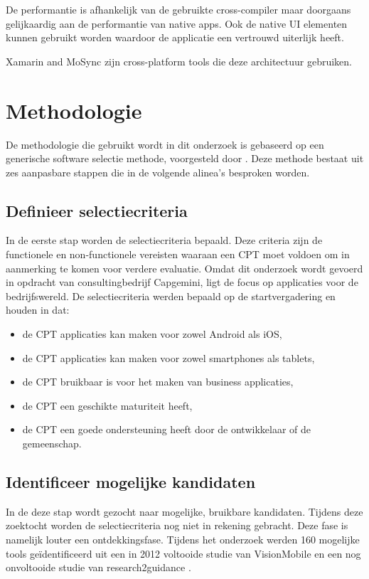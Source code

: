 \documentclass[a4paper]{IEEEconf}
\begin{document}
De performantie is afhankelijk van de gebruikte cross-compiler maar doorgaans gelijkaardig aan de performantie van native apps. Ook de native UI elementen kunnen gebruikt worden waardoor de applicatie een vertrouwd uiterlijk heeft.

Xamarin and MoSync zijn cross-platform tools die deze architectuur gebruiken.

\section{Methodologie}

De methodologie die gebruikt wordt in dit onderzoek is gebaseerd op een generische software selectie methode, voorgesteld door \citet{Jadhav:2011}. Deze methode bestaat uit zes aanpasbare stappen die in de volgende alinea's besproken worden.

\subsection{Definieer selectiecriteria}

In de eerste stap worden de selectiecriteria bepaald. Deze criteria zijn de functionele en non-functionele vereisten waaraan een CPT moet voldoen om in aanmerking te komen voor verdere evaluatie. Omdat dit onderzoek wordt gevoerd in opdracht van consultingbedrijf Capgemini, ligt de focus op applicaties voor de bedrijfswereld. De selectiecriteria werden bepaald op de startvergadering en houden in dat:

\begin{itemize}
    \item de CPT applicaties kan maken voor zowel Android als iOS,
    \item de CPT applicaties kan maken voor zowel smartphones als tablets,
    \item de CPT bruikbaar is voor het maken van business applicaties,
    \item de CPT een geschikte maturiteit heeft,
    \item de CPT een goede ondersteuning heeft door de ontwikkelaar of de gemeenschap.
\end{itemize}

\subsection{Identificeer mogelijke kandidaten}

In de deze stap wordt gezocht naar mogelijke, bruikbare kandidaten. Tijdens deze zoektocht worden de selectiecriteria nog niet in rekening gebracht. Deze fase is namelijk louter een ontdekkingsfase. Tijdens het onderzoek werden 160 mogelijke tools ge\"identificeerd uit een in 2012 voltooide studie van VisionMobile \cite{VMCPT:2012} en een nog onvoltooide studie van  research2guidance \cite{Research2guidance}. 
\end{document}
